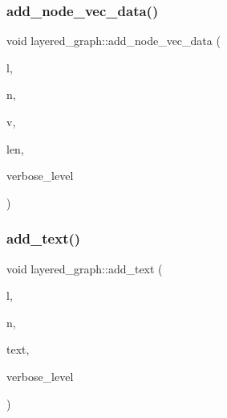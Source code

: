 \subsubsection{\texorpdfstring{add\+\_\+node\+\_\+vec\+\_\+data()}{add\_node\_vec\_data()}}
{\footnotesize\ttfamily void layered\+\_\+graph\+::add\+\_\+node\+\_\+vec\+\_\+data (\begin{DoxyParamCaption}\item[{\mbox{\hyperlink{galois_8h_a09fddde158a3a20bd2dcadb609de11dc}{I\+NT}}}]{l,  }\item[{\mbox{\hyperlink{galois_8h_a09fddde158a3a20bd2dcadb609de11dc}{I\+NT}}}]{n,  }\item[{\mbox{\hyperlink{galois_8h_a09fddde158a3a20bd2dcadb609de11dc}{I\+NT}} $\ast$}]{v,  }\item[{\mbox{\hyperlink{galois_8h_a09fddde158a3a20bd2dcadb609de11dc}{I\+NT}}}]{len,  }\item[{\mbox{\hyperlink{galois_8h_a09fddde158a3a20bd2dcadb609de11dc}{I\+NT}}}]{verbose\+\_\+level }\end{DoxyParamCaption})}

\mbox{\label{classlayered__graph_aa9c738e91c1bbd546c39e6a32ff05c83}} 
\subsubsection{\texorpdfstring{add\+\_\+text()}{add\_text()}}
{\footnotesize\ttfamily void layered\+\_\+graph\+::add\+\_\+text (\begin{DoxyParamCaption}\item[{\mbox{\hyperlink{galois_8h_a09fddde158a3a20bd2dcadb609de11dc}{I\+NT}}}]{l,  }\item[{\mbox{\hyperlink{galois_8h_a09fddde158a3a20bd2dcadb609de11dc}{I\+NT}}}]{n,  }\item[{const \mbox{\hyperlink{galois_8h_ab6cc7b4aeb6ea31aba2b3fbfc83ff5e6}{B\+Y\+TE}} $\ast$}]{text,  }\item[{\mbox{\hyperlink{galois_8h_a09fddde158a3a20bd2dcadb609de11dc}{I\+NT}}}]{verbose\+\_\+level }\end{DoxyParamCaption})}

\mbox{\label{classlayered__graph_a47ab111bd0c2805d1d1fbf3312145e57}} 
